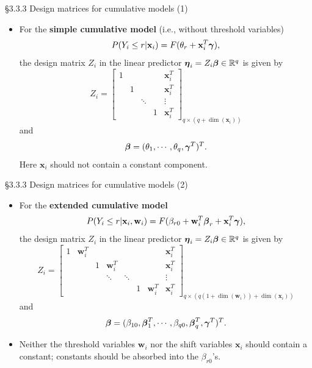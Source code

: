 \documentclass{beamer}
\begin{document}
\begin{frame}{\S3.3.3 Design matrices for cumulative models (1)}
\begin{itemize}
\item
For the {\bf simple cumulative model} (i.e., without threshold variables)
$$P(Y_i\leq r|\textbf{x}_i)=F(\theta_r+\textbf{x}_i^T\mbox{\boldmath $\gamma$}),$$
the design matrix $Z_i$ in the linear predictor $\mbox{\boldmath $\eta$}_i=Z_i\mbox{\boldmath $\beta$} \in \mathbb{R}^q$
is given by
$$Z_i=\left[\begin{array}{ccccc}1 & & & & \textbf{x}_i^T \\
& 1 & & &  \textbf{x}_i^T \\ & & \ddots & & \vdots \\
& & & 1 & \textbf{x}_i^T\end{array}\right]_{q\times (q+\dim(\textbf{x}_i))}$$
and 
$$\mbox{\boldmath $\beta$}=(\theta_1,\cdots, \theta_q, \mbox{\boldmath $\gamma$}^T)^T.$$
Here $\textbf{x}_i$ should not contain a constant component.
\end{itemize}
\end{frame}



\begin{frame} {\S3.3.3 Design matrices for cumulative models (2)}
\begin{itemize}
\item
For the {\bf extended cumulative model}
$$P(Y_i\leq r|\textbf{x}_i, \textbf{w}_i)=F(\beta_{r0}+\textbf{w}_i^T\mbox{\boldmath $\beta$}_r+
\textbf{x}_i^T\mbox{\boldmath $\gamma$}),$$ 
the design
matrix $Z_i$ in the linear predictor $\mbox{\boldmath $\eta$}_i=Z_i\mbox{\boldmath $\beta$} \in \mathbb{R}^q$
is given by
$$Z_i=\left[\begin{array}{cccccccc}1 & \textbf{w}_i^T & & & & & & \textbf{x}_i^T \\
& & 1 & \textbf{w}_i^T & & & &  \textbf{x}_i^T \\ & & & \ddots & \ddots & & & \vdots \\
& & & & & 1 & \textbf{w}_i^T & \textbf{x}_i^T\end{array}\right]_{q\times (q(1+\dim(\textbf{w}_i))+\dim(\textbf{x}_i))}$$
and 
$$\mbox{\boldmath $\beta$}=(\beta_{10},\mbox{\boldmath $\beta$}_1^T,\cdots, \beta_{q0},
\mbox{\boldmath $\beta$}_q^T, \mbox{\boldmath $\gamma$}^T)^T.$$
\item Neither the threshold variables $\textbf{w}_i$ nor the shift variables $\textbf{x}_i$ should contain a constant; constants should be absorbed into the $\beta_{r0}$'s. 
\end{itemize}
\end{frame}
\end{document}
